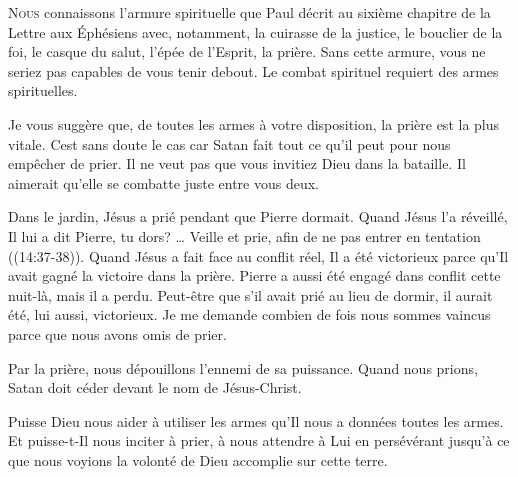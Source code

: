 \dvrule







\lettrine{N}{ous} connaissons l'armure spirituelle que Paul décrit
 au sixième chapitre de la Lettre aux Éphésiens avec, notamment,
 la cuirasse de la justice, le bouclier de la foi, le casque du salut,
 l'épée de l'Esprit, la prière. Sans cette armure,
 vous ne seriez pas capables de vous tenir debout.
 Le combat spirituel requiert des armes spirituelles.

Je vous suggère que, de toutes les armes à votre disposition,
 la prière est la plus vitale. Cest sans doute le cas car Satan
 fait tout ce qu'il peut pour nous empêcher de prier.
 Il ne veut pas que vous invitiez Dieu dans la bataille.
 Il aimerait qu'elle se combatte juste entre vous deux.


Dans le jardin, Jésus a prié pendant que Pierre dormait.
 Quand Jésus l'a réveillé, Il lui a dit\frcolon{} 
 \Og Pierre, tu dors? \dots{} Veille et prie, afin de ne pas entrer
 en tentation \Fg{} ((14:37-38)).
 Quand Jésus a fait face au conflit réel, Il a été victorieux
 parce qu'Il avait gagné la victoire dans la prière.
 Pierre a aussi été engagé dans conflit cette nuit-là, mais il a perdu.
 Peut-être que s'il avait prié au lieu de dormir,
 il aurait été, lui aussi, victorieux. Je me demande combien de fois
 nous sommes vaincus parce que nous avons omis de prier.

Par la prière, nous dépouillons l'ennemi de sa puissance.
 Quand nous prions, Satan doit céder devant le nom de Jésus-Christ.

Puisse Dieu nous aider à utiliser les armes qu'Il nous a données
 \ocadr toutes les armes. Et puisse-t-Il nous inciter à prier,
 à nous attendre à Lui en persévérant jusqu'à ce que nous voyions
 la volonté de Dieu accomplie sur cette terre.

